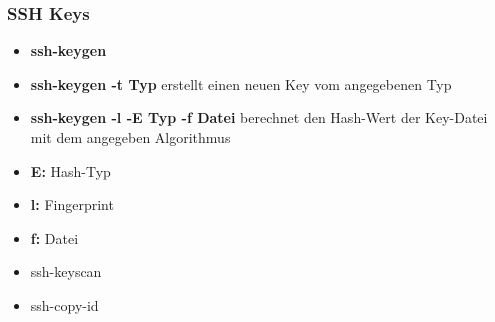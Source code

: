 \begin{frame}
\frametitle{SSH Keys}
\begin{itemize}
\item \textbf{ssh-keygen} 
\pause
\item \textbf{ssh-keygen -t Typ} erstellt einen neuen Key vom angegebenen Typ
\pause
\item \textbf{ssh-keygen -l -E Typ -f Datei} berechnet den Hash-Wert der Key-Datei mit dem angegeben Algorithmus
\pause
\item \textbf{E:} Hash-Typ
\pause
\item \textbf{l:} Fingerprint
\pause
\item \textbf{f:} Datei 
\pause
\item ssh-keyscan
\pause
\item ssh-copy-id
\end{itemize}
\end{frame}